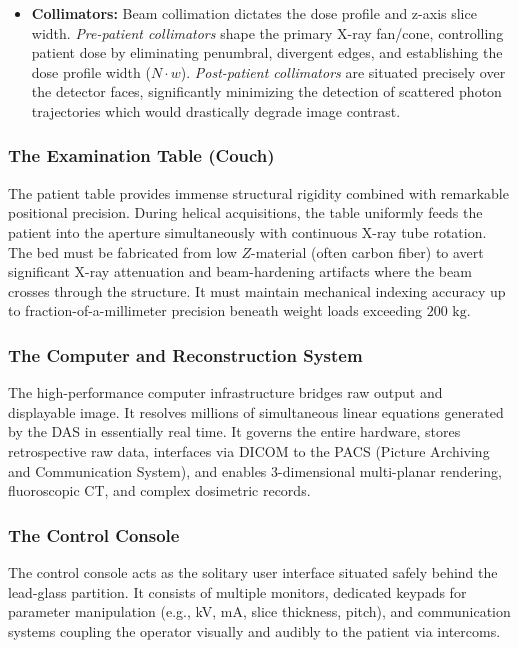 \begin{itemize}
    \item \textbf{Collimators:} Beam collimation dictates the dose profile and z-axis slice width. \textit{Pre-patient collimators} shape the primary X-ray fan/cone, controlling patient dose by eliminating penumbral, divergent edges, and establishing the dose profile width ($N \cdot w$). \textit{Post-patient collimators} are situated precisely over the detector faces, significantly minimizing the detection of scattered photon trajectories which would drastically degrade image contrast.
\end{itemize}

\subsubsection{The Examination Table (Couch)}
The patient table provides immense structural rigidity combined with remarkable positional precision. During helical acquisitions, the table uniformly feeds the patient into the aperture simultaneously with continuous X-ray tube rotation. The bed must be fabricated from low $Z$-material (often carbon fiber) to avert significant X-ray attenuation and beam-hardening artifacts where the beam crosses through the structure. It must maintain mechanical indexing accuracy up to fraction-of-a-millimeter precision beneath weight loads exceeding $200\text{ kg}$. 

\subsubsection{The Computer and Reconstruction System}
The high-performance computer infrastructure bridges raw output and displayable image. It resolves millions of simultaneous linear equations generated by the DAS in essentially real time. It governs the entire hardware, stores retrospective raw data, interfaces via DICOM to the PACS (Picture Archiving and Communication System), and enables 3-dimensional multi-planar rendering, fluoroscopic CT, and complex dosimetric records.

\subsubsection{The Control Console}
The control console acts as the solitary user interface situated safely behind the lead-glass partition. It consists of multiple monitors, dedicated keypads for parameter manipulation (e.g., kV, mA, slice thickness, pitch), and communication systems coupling the operator visually and audibly to the patient via intercoms.

